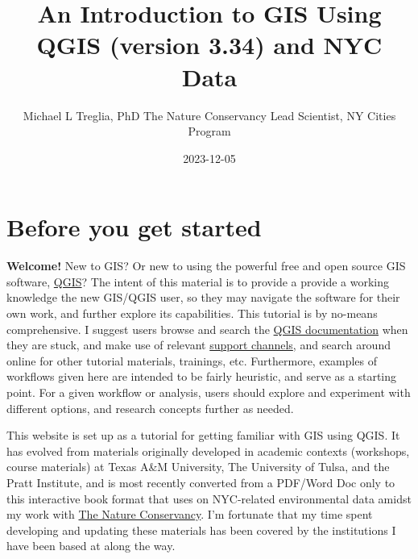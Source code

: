 \documentclass[
  letterpaper,
  DIV=11,
  numbers=noendperiod]{scrreprt}
\title{An Introduction to GIS Using QGIS (version 3.34) and NYC Data}
\author{Michael L Treglia, PhD The Nature Conservancy Lead Scientist, NY
Cities Program}
\date{2023-12-05}
\renewcommand*\contentsname{Table of contents}
\newcommand\contentsname{Table of contents}
\begin{document}
\maketitle
\ifdefined\Shaded\renewenvironment{Shaded}{\begin{tcolorbox}[boxrule=0pt, sharp corners, breakable, frame hidden, borderline west={3pt}{0pt}{shadecolor}, enhanced, interior hidden]}{\end{tcolorbox}}\fi

\renewcommand*\contentsname{Table of contents}
{
\hypersetup{linkcolor=}
\setcounter{tocdepth}{2}
\tableofcontents
}

\hypertarget{before-you-get-started}{%
\chapter*{Before you get started}\label{before-you-get-started}}


\textbf{Welcome!} New to GIS? Or new to using the powerful free and open
source GIS software, \href{https://www.qgis.org?}{QGIS}? The intent of
this material is to provide a provide a working knowledge the new
GIS/QGIS user, so they may navigate the software for their own work, and
further explore its capabilities. This tutorial is by no-means
comprehensive. I suggest users browse and search the
\href{https://qgis.org/en/docs/index.html}{QGIS documentation} when they
are stuck, and make use of relevant
\href{https://qgis.org/en/site/forusers/support.html}{support channels},
and search around online for other tutorial materials, trainings, etc.
Furthermore, examples of workflows given here are intended to be fairly
heuristic, and serve as a starting point. For a given workflow or
analysis, users should explore and experiment with different options,
and research concepts further as needed.

This website is set up as a tutorial for getting familiar with GIS using
QGIS. It has evolved from materials originally developed in academic
contexts (workshops, course materials) at Texas A\&M University, The
University of Tulsa, and the Pratt Institute, and is most recently
converted from a PDF/Word Doc only to this interactive book format that
uses on NYC-related environmental data amidst my work with
\href{https://nature.org}{The Nature Conservancy}. I'm fortunate that my
time spent developing and updating these materials has been covered by
the institutions I have been based at along the way.
\end{document}
